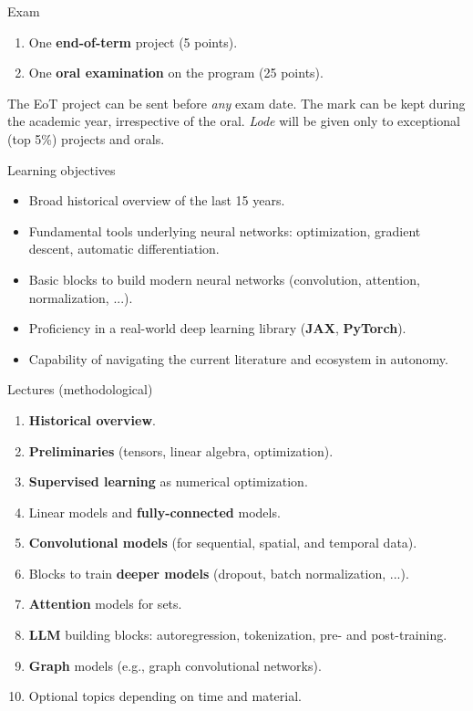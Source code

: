 \documentclass[12pt,aspectratio=169,notheorems]{beamer}
\begin{document}
\begin{frame}{Exam}

	\begin{enumerate}
		\item One \textbf{end-of-term} project (5 points).
		\item One \textbf{oral examination} on the program (25 points).
	\end{enumerate}

	The EoT project can be sent before \textit{any} exam date. The mark can be kept during the academic year, irrespective of the oral. \textit{Lode} will be given only to exceptional (top 5\%) projects and orals.

\end{frame}

\begin{frame}{Learning objectives}


	\begin{itemize}
		\item Broad historical overview of the last 15 years.
		\item Fundamental tools underlying neural networks: optimization, gradient descent, automatic differentiation.
		\item Basic blocks to build modern neural networks (convolution, attention, normalization, ...).
		\item Proficiency in a real-world deep learning library (\textbf{JAX}, \textbf{PyTorch}).
		\item Capability of navigating the current literature and ecosystem in autonomy.
	\end{itemize}

\end{frame}

\begin{frame}{Lectures (methodological)}

	\begin{enumerate}
		\item \textbf{Historical overview}.
		\item \textbf{Preliminaries} (tensors, linear algebra, optimization).
		\item \textbf{Supervised learning} as numerical optimization.
		\item Linear models and \textbf{fully-connected} models.
		\item \textbf{Convolutional models} (for sequential, spatial, and temporal data).
		\item Blocks to train \textbf{deeper models} (dropout, batch normalization, ...).
		\item \textbf{Attention} models for sets.
		\item \textbf{LLM} building blocks: autoregression, tokenization, pre- and post-training.
		\item \textbf{Graph} models (e.g., graph convolutional networks).
		\item Optional topics depending on time and material.
	\end{enumerate}

\end{frame}
\end{document}
